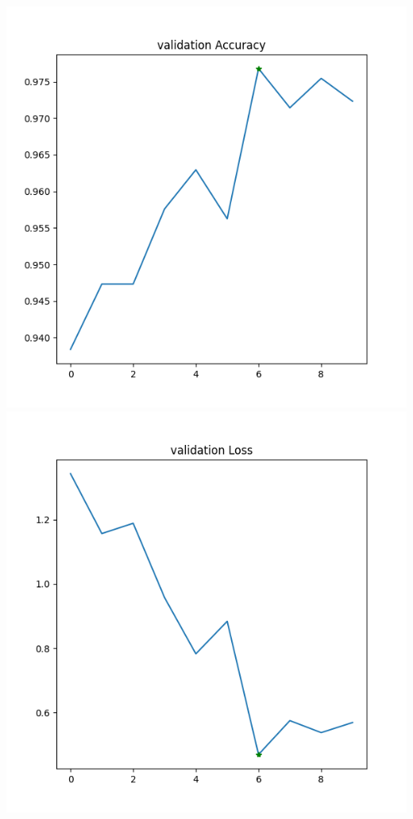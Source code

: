 \begin{enumerate}
    \includegraphics[scale=0.5]{images/report/Human-validation-accuracy}
    \includegraphics[scale=0.5]{images/report/Human-validation-loss}
\end{enumerate}

